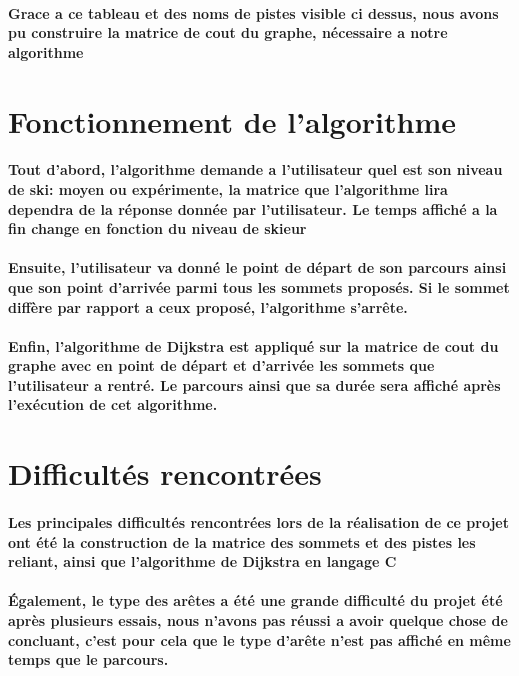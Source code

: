 \documentclass[a4paper,11pt,fleqn]{article}
\begin{document}
\paragraph{Grace a ce tableau et des noms de pistes visible ci dessus, nous avons pu construire la matrice de cout du graphe, nécessaire a notre algorithme}

\section{Fonctionnement de l'algorithme}

\paragraph{Tout d'abord, l'algorithme demande a l'utilisateur quel est son niveau de ski: moyen ou expérimente, la matrice que l'algorithme lira dependra de la réponse donnée par l'utilisateur. Le temps affiché a la fin change en fonction du niveau de skieur}

\paragraph{Ensuite, l'utilisateur va donné le point de départ de son parcours ainsi que son point d'arrivée parmi tous les sommets proposés. Si le sommet diffère par rapport a ceux proposé, l'algorithme s'arrête.}

\paragraph{Enfin, l'algorithme de Dijkstra est appliqué sur la matrice de cout du graphe avec en point de départ et d'arrivée les sommets que l'utilisateur a rentré. Le parcours ainsi que sa durée sera affiché après l'exécution de cet algorithme.}

\section{Difficultés rencontrées }

\paragraph{Les principales difficultés rencontrées lors de la réalisation de ce projet ont été la construction de la matrice des sommets et des pistes les reliant, ainsi que l'algorithme de Dijkstra en langage C}

\paragraph{Également, le type des arêtes a été une grande difficulté du projet été après plusieurs essais, nous n'avons pas réussi a avoir quelque chose de concluant, c'est pour cela que le type d'arête n'est pas affiché en même temps que le parcours.}
\end{document}
